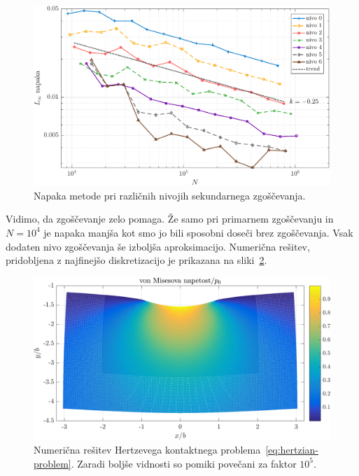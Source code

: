 \documentclass[12pt,a4paper,twoside]{article}
\theoremstyle{definition} %
\theoremstyle{plain} %
\numberwithin{equation}{section}
\newlength{\iw}
\begin{document}
\begin{figure}[h]
  \centering
  \includegraphics[width=\iw]{images/hertzian_refine_levels_convergence.pdf}
  \caption{Napaka metode pri različnih nivojih sekundarnega zgoščevanja.}
  \label{fig:hertz-refined-convergence}
\end{figure}

Vidimo, da zgoščevanje zelo pomaga. Že samo pri primarnem zgoščevanju in $N = 10^4$ je napaka manjša
kot smo jo bili sposobni doseči brez zgoščevanja. Vsak dodaten nivo zgoščevanja še izboljša
aproksimacijo. Numerična rešitev, pridobljena z najfinejšo diskretizacijo je prikazana na
sliki~\ref{fig:hertz-solution}.

\begin{figure}[h]
  \centering
  \includegraphics[width=\iw]{images/hertzian_solution_deformed_vm.png}
  \caption[Numerična rešitev Hertzevega kontaktnega problema.]{Numerična
  rešitev Hertzevega kontaktnega problema~\eqref{eq:hertzian-problem}. Zaradi
  boljše vidnosti so pomiki povečani za faktor $10^5$.}
  \label{fig:hertz-solution}
\end{figure}
\end{document}
